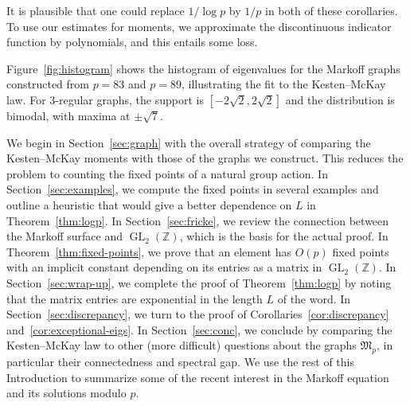 \documentclass[AHL, Unicode, longabstracts, published]{cedram}
\newcommand{\Z}{\mathbb{Z}}
\DeclareMathOperator{\GL}{GL}
\DeclareMathOperator{\GL}{GL}
\newcommand{\Z}{\mathbb{Z}}
\begin{document}
It is plausible that one could replace $1/\log{p}$ by $1/p$ in both of these corollaries. To use our estimates for moments, we approximate the discontinuous indicator function by polynomials, and this entails some loss.

Figure~\ref{fig:histogram} shows the histogram of eigenvalues for the Markoff graphs constructed from $p=83$ and $p=89$, illustrating the fit to the Kesten--McKay law. For $3$-regular graphs, the support is $[-2\sqrt{2}, 2\sqrt{2}]$ and the distribution is bimodal, with maxima at $\pm \sqrt{7}$.

We begin in Section~\ref{sec:graph} with the overall strategy of comparing the Kesten--McKay moments with those of the graphs we construct. This reduces the problem to counting the fixed points of a natural group action. In Section~\ref{sec:examples}, we compute the fixed points in several examples and outline a heuristic that would give a better dependence on $L$ in Theorem~\ref{thm:logp}. In Section~\ref{sec:fricke}, we review the connection between the Markoff surface and $\GL_2(\Z)$, which is the basis for the actual proof. In Theorem~\ref{thm:fixed-points}, we prove that an element has $O(p)$ fixed points with an implicit constant depending on its entries as a matrix in $\GL_2(\Z)$. In Section~\ref{sec:wrap-up}, we complete the proof of Theorem~\ref{thm:logp} by noting that the matrix entries are exponential in the length $L$ of the word. In Section~\ref{sec:discrepancy}, we turn to the proof of Corollaries~\ref{cor:discrepancy} and~\ref{cor:exceptional-eigs}. In Section~\ref{sec:conc}, we conclude by comparing the Kesten--McKay law to other (more difficult) questions about the graphs $\mathfrak{M}_p$, in particular their connectedness and spectral gap. We use the rest of this Introduction to summarize some of the recent interest in the Markoff equation and its solutions modulo $p$.
\end{document}
